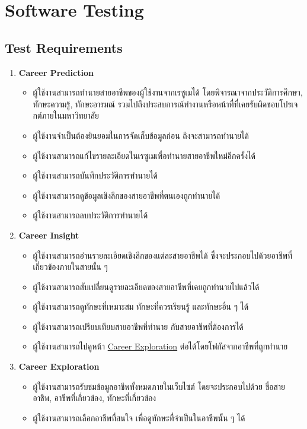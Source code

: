 \section{Software Testing}
\subsection{Test Requirements}
\begin{enumerate}
    \item \textbf{Career Prediction}
          \begin{itemize}
              \item ผู้ใช้งานสามารถทำนายสายอาชีพของผู้ใช้งานจากเรซูเมได้ โดยพิจารณาจากประวัติการศึกษา, ทักษะความรู้, ทักษะอารมณ์ รวมไปถึงประสบการณ์ทำงานหรือหน้าที่ที่เคยรับผิดชอบโปรเจกต์ภายในมหาวิทยาลัย
              \item ผู้ใช้งานจำเป็นต้องยินยอมในการจัดเก็บข้อมูลก่อน ถึงจะสามารถทำนายได้
              \item ผู้ใช้งานสามารถแก้ไขรายละเอียดในเรซูเมเพื่อทำนายสายอาชีพใหม่อีกครั้งได้
              \item ผู้ใช้งานสามารถบันทึกประวัติการทำนายได้
              \item ผู้ใช้งานสามารถดูข้อมูลเชิงลึกของสายอาชีพที่ตนเองถูกทำนายได้
              \item ผู้ใช้งานสามารถลบประวัติการทำนายได้
          \end{itemize}
    \item \textbf{Career Insight}
          \begin{itemize}
              \item ผู้ใช้งานสามารถอ่านรายละเอียดเชิงลึกของแต่ละสายอาชีพได้ ซึ่งจะประกอบไปด้วยอาชีพที่เกี่ยวข้องภายในสายนั้น ๆ
              \item ผู้ใช้งานสามารถสับเปลี่ยนดูรายละเอียดของสายอาชีพที่เคยถูกทำนายไปแล้วได้
              \item ผู้ใช้งานสามารถดูทักษะที่เหมาะสม ทักษะที่ควรเรียนรู้ และทักษะอื่น ๆ ได้
              \item ผู้ใช้งานสามารถเปรียบเทียบสายอาชีพที่ทำนาย กับสายอาชีพที่ต้องการได้
              \item ผู้ใช้งานสามารถไปดูหน้า \hyperref[subsec:Career Exploration]{Career Exploration} ต่อได้โดยโฟกัสจากอาชีพที่ถูกทำนาย
          \end{itemize}
    \item \textbf{Career Exploration}
          \begin{itemize}
              \item ผู้ใช้งานสามารถรับชมข้อมูลอาชีพทั้งหมดภายในเว็บไซต์ โดยจะประกอบไปด้วย ชื่อสายอาชีพ, อาชีพที่เกี่ยวข้อง, ทักษะที่เกี่ยวข้อง
              \item ผู้ใช้งานสามารถเลือกอาชีพที่สนใจ เพื่อดูทักษะที่จำเป็นในอาชีพนั้น ๆ ได้
          \end{itemize}
\end{enumerate}
\label{sec:test-subsection}
